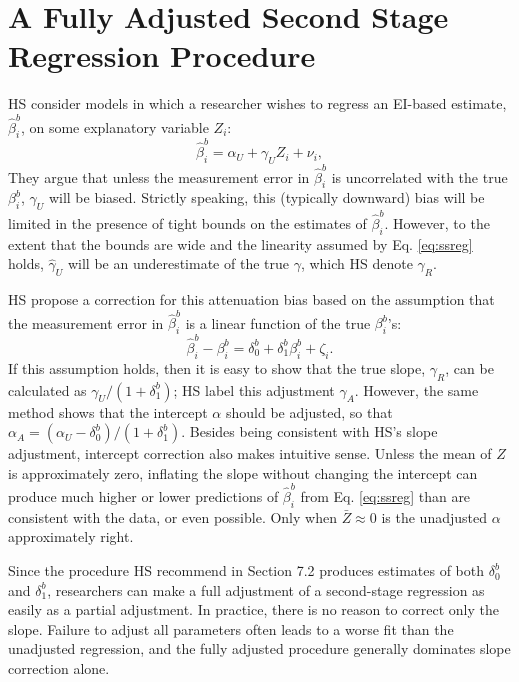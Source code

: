 \documentclass[11pt,titlepage]{article}
\begin{document}
\section{A Fully Adjusted Second Stage Regression Procedure}
\label{s:fulladj}
HS consider models in which a researcher wishes to regress an EI-based
estimate, $\hat\beta_i^b$, on some explanatory variable $Z_i$:
\begin{equation}
\label{eq:ssreg}
\hat\beta_i^b=\alpha_U+\gamma_U Z_i + \nu_i,
\end{equation}
They argue that unless the measurement error in $\hat\beta_i^b$ is
uncorrelated with the true $\beta_i^b$, $\gamma_U$ will be biased.
Strictly speaking, this (typically downward) bias will be limited in
the presence of tight bounds on the estimates of $\hat\beta_i^b$.
However, to the extent that the bounds are wide and the linearity
assumed by Eq. \ref{eq:ssreg} holds, $\hat\gamma_U$ will be an
underestimate of the true $\gamma$, which HS denote $\gamma_R$.

HS propose a correction for this attenuation bias based on the
assumption that the measurement error in $\hat\beta_i^b$ is a linear
function of the true $\beta_i^b$'s:
\begin{equation}
\label{eq:hserr}
\hat\beta_i^b - \beta_i^b = \delta_0^b + \delta_1^b\beta_i^b + \zeta_i.
\end{equation}
If this assumption holds, then it is easy to show that the true slope,
$\gamma_R$, can be calculated as $\gamma_U/(1 + \delta_1^b)$; HS label
this adjustment $\gamma_A$.  However, the same method shows that the
intercept $\alpha$ should be adjusted, so that $\alpha_A =
(\alpha_U-\delta_0^b)/(1+\delta_1^b)$.  Besides being consistent with
HS's slope adjustment, intercept correction also makes intuitive
sense.  Unless the mean of $Z$ is approximately zero, inflating the
slope without changing the intercept can produce much higher or lower
predictions of $\hat\beta_i^b$ from Eq.  \ref{eq:ssreg} than are
consistent with the data, or even possible.  Only when $\bar Z \approx
0$ is the unadjusted $\alpha$ approximately right.

Since the procedure HS recommend in Section 7.2 produces estimates of
both $\delta_0^b$ and $\delta_1^b$, researchers can make a full
adjustment of a second-stage regression as easily as a partial
adjustment.  In practice, there is no reason to correct only the
slope.  Failure to adjust all parameters often leads to a worse fit
than the unadjusted regression, and the fully adjusted procedure
generally dominates slope correction alone.
\end{document}

